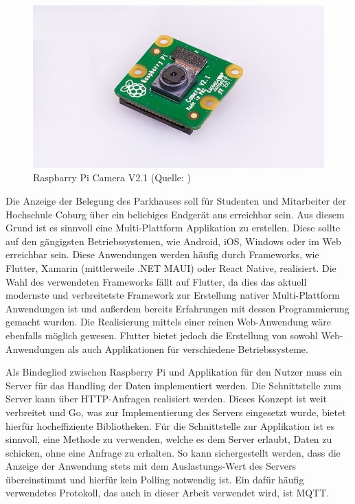 \begin{figure}[h]
	\myImagePos{}
	\includegraphics[width=0.6\myImageWidth]{Bilder/piCam.jpg}
	\caption[Raspberry Pi Camera V2.1]{Raspbarry Pi Camera V2.1 (Quelle: \cite{foundationEnglishRaspberryPi2018})}
	\label{fig:PiCAM}
\end{figure}

Die Anzeige der Belegung des Parkhauses soll für Studenten und Mitarbeiter der Hochschule Coburg über ein beliebiges Endgerät aus erreichbar sein.
Aus diesem Grund ist es sinnvoll eine Multi-Plattform Applikation zu erstellen.
Diese sollte auf den gängigsten Betriebssystemen, wie Android, iOS, Windows oder im Web erreichbar sein.
Diese Anwendungen werden häufig durch Frameworks, wie Flutter, Xamarin (mittlerweile .NET MAUI) oder React Native, realisiert.
Die Wahl des verwendeten Frameworks fällt auf Flutter, da dies das aktuell modernste und verbreitetste Framework zur Erstellung nativer Multi-Plattform Anwendungen ist und außerdem bereits Erfahrungen mit dessen Programmierung gemacht wurden.
Die Realisierung mittels einer reinen Web-Anwendung wäre ebenfalls möglich gewesen.
Flutter bietet jedoch die Erstellung von sowohl Web-Anwendungen als auch Applikationen für verschiedene Betriebssysteme.

Als Bindeglied zwischen Raspberry Pi und Applikation für den Nutzer muss ein Server für das Handling der Daten implementiert werden.
Die Schnittstelle zum Server kann über HTTP-Anfragen realisiert werden.
Dieses Konzept ist weit verbreitet und Go, was zur Implementierung des Servers eingesetzt wurde, bietet hierfür hocheffiziente Bibliotheken.
Für die Schnittstelle zur Applikation ist es sinnvoll, eine Methode zu verwenden, welche es dem Server erlaubt, Daten zu schicken, ohne eine Anfrage zu erhalten.
So kann sichergestellt werden, dass die Anzeige der Anwendung stets mit dem Auslastungs-Wert des Servers übereinstimmt und hierfür kein Polling notwendig ist.
Ein dafür häufig verwendetes Protokoll, das auch in dieser Arbeit verwendet wird, ist MQTT.\@
